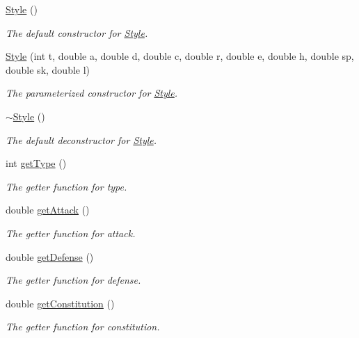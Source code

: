 \begin{DoxyCompactItemize}
\item 
\mbox{\hyperlink{class_style_a914f187818eb30c0cebe3df5378bfa0a}{Style}} ()
\begin{DoxyCompactList}\small\item\em The default constructor for \mbox{\hyperlink{class_style}{Style}}. \end{DoxyCompactList}\item 
\mbox{\hyperlink{class_style_a5f36adc7f50bf705b9c21817cb05c267}{Style}} (int t, double a, double d, double c, double r, double e, double h, double sp, double sk, double l)
\begin{DoxyCompactList}\small\item\em The parameterized constructor for \mbox{\hyperlink{class_style}{Style}}. \end{DoxyCompactList}\item 
\mbox{\hyperlink{class_style_a7c798ef9b77bc94719542feade497725}{$\sim$\+Style}} ()
\begin{DoxyCompactList}\small\item\em The default deconstructor for \mbox{\hyperlink{class_style}{Style}}. \end{DoxyCompactList}\item 
int \mbox{\hyperlink{class_style_a15e75f3291c7a3cacf317c6d0a170060}{get\+Type}} ()
\begin{DoxyCompactList}\small\item\em The getter function for type. \end{DoxyCompactList}\item 
double \mbox{\hyperlink{class_style_ae46ba0263757bb89598881126e9600ec}{get\+Attack}} ()
\begin{DoxyCompactList}\small\item\em The getter function for attack. \end{DoxyCompactList}\item 
double \mbox{\hyperlink{class_style_a16f8ba98a066b96aa2900f1c9af6d716}{get\+Defense}} ()
\begin{DoxyCompactList}\small\item\em The getter function for defense. \end{DoxyCompactList}\item 
double \mbox{\hyperlink{class_style_afffe5458fde2c128c83e20a47654586d}{get\+Constitution}} ()
\begin{DoxyCompactList}\small\item\em The getter function for constitution. \end{DoxyCompactList}\item 

\end{DoxyCompactItemize}
